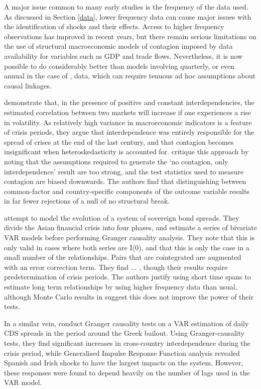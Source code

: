 \documentclass[../base.tex]{subfiles}
\begin{document}
A major issue common to many early studies is the frequency of the data used. As discussed in Section \ref{data}, lower frequency data can cause major issues with the identification of shocks and their effects. Access to higher frequency observations has improved in recent years, but there remain serious limitations on the use of structural macroeconomic models of contagion imposed by data availability for variables such as GDP and trade flows. Nevertheless, it is now possible to do considerably better than models involving quarterly, or even annual in the case of \cite{esquivel1998explaining}, data, which can require tenuous ad hoc assumptions about causal linkages.

\cite{forbes2002no} demonstrate that, in the presence of positive and constant interdependencies, the estimated correlation between two markets will increase if one experiences a rise in volatility. As relatively high variance in macroeconomic indicators is a feature of crisis periods, they argue that interdependence was entirely responsible for the spread of crises at the end of the last century, and that contagion becomes insignificant when heteroskedasticity is accounted for. \cite{corsetti2005some} critique this approach by noting that the assumptions required to generate the `no contagion, only interdependence' result are too strong, and the test statistics used to measure contagion are biased downwards. The authors find that distinguishing between common-factor and country-specific components of the outcome variable results in far fewer rejections of a null of no structural break. 


\cite{sander2003contagion} attempt to model the evolution of a system of sovereign bond spreads. They divide the Asian financial crisis into four phases, and estimate a series of bivariate VAR models before performing Granger causality analysis. They note that this is only valid in cases where both series are I(0), and that this is only the case in a small number of the relationships. Pairs that are cointegrated are augmented with an error correction term. They find ... , though their results require predetermination of crisis periods. The authors justify using short time spans to estimate long term relationships by using higher frequency data than usual, although Monte Carlo results in \cite{pierse1995temporal} suggest this does not improve the power of their tests.

In a similar vein,  \cite{kalbaska2012eurozone}conduct Granger causality tests on a VAR estimation of daily CDS spreads in the period around the Greek bailout. Using Granger-causality tests, they find significant increases in cross-country interdependence during the crisis period, while Generalised Impulse Response Function analysis revealed Spanish and Irish shocks to have the largest impacts on the system. However, these responses were found to depend heavily on the number of lags used in the VAR model.
\end{document}
